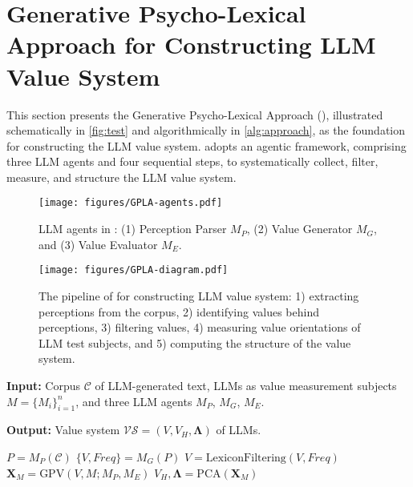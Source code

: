 \section{Generative Psycho-Lexical Approach for Constructing LLM Value System}
\label{sec:approach}

This section presents the Generative Psycho-Lexical Approach (\our{}), illustrated schematically in \cref{fig:test} and algorithmically in \cref{alg:approach}, as the foundation for constructing the LLM value system. \our{} adopts an agentic framework, comprising three LLM agents and four sequential steps, to systematically collect, filter, measure, and structure the LLM value system.

\begin{figure*}[t]
  \centering
  \begin{subfigure}{\textwidth}
    \centering
    \texttt{[image: figures/GPLA-agents.pdf]}
    \caption{LLM agents in \our{}: (1) Perception Parser $M_{P}$, (2) Value Generator $M_{G}$, and (3) Value Evaluator $M_{E}$.}
    \label{fig:sub1}
  \end{subfigure}
  
  \begin{subfigure}{\textwidth}
    \centering
    \texttt{[image: figures/GPLA-diagram.pdf]}
    \caption{The pipeline of \our{} for constructing LLM value system: 1) extracting perceptions from the corpus, 2) identifying values behind perceptions, 3) filtering values, 4) measuring value orientations of LLM test subjects, and 5) computing the structure of the value system.}
    \label{fig:sub2}
  \end{subfigure}
  
  \caption{Generative Psycho-lexical Approach (\our{}) for Constructing LLM Value System.}
  \label{fig:test}
\end{figure*}


\begin{algorithm*}
  \caption{Generative Psycho-lexical Approach for Constructing LLM Value System}
  \label{alg:approach}
  \begin{algorithmic}[1]
  \STATE \textbf{Input:} Corpus $\mathcal{C}$ of LLM-generated text, LLMs as value measurement subjects $M = \{M_i\}_{i=1}^{n}$, and three LLM agents $M_{P}$, $M_{G}$, $M_{E}$.
  
  \STATE \textbf{Output:} Value system $\mathcal{VS} = (V, V_H, \mathbf{\Lambda})$ of LLMs.
  
  \STATE $P = M_{P}(\mathcal{C})$ 
  \STATE $\{V, Freq\} = M_{G}(P)$ 
  \STATE $V = \text{LexiconFiltering}(V, Freq)$ 
  \STATE $\mathbf{X}_{M} = \text{GPV}(V, M; M_{P}, M_{E})$  
  \STATE $V_H, \mathbf{\Lambda} = \text{PCA}(\mathbf{X}_{M})$ 
  \end{algorithmic}
\end{algorithm*}


